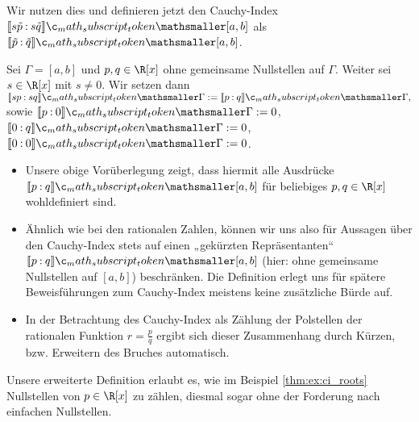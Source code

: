\documentclass{mythesis}
\begin{document}
Wir nutzen dies und definieren jetzt den Cauchy-Index $\Index{[a,b]}{s\tilde p}{s \tilde q}$ als $\Index{[a,b]}{\tilde p}{\tilde q}$.

\begin{definition} \label{thm:def:ci_common-roots}
    Sei $\Gamma = [a, b]$ und $p, q \in \R[x]$ ohne gemeinsame Nullstellen auf $\Gamma$.
    Weiter sei $s \in \R[x]$ mit $s \neq 0$.
%
    Wir setzen dann
    \begin{math}
        \Index{\Gamma}{sp}{sq} := \Index{\Gamma}{p}{q},
    \end{math}
    sowie $\Index{\Gamma}{p}{0} := 0$, $\Index{\Gamma}{0}{q} := 0$, $\Index{\Gamma}{0}{0} := 0$.
    \begin{note}
        \begin{itemize}
            \item
                Unsere obige Vorüberlegung zeigt, dass hiermit alle Ausdrücke $\Index{[a,b]}{p}{q}$ für beliebiges $p, q \in \R[x]$ wohldefiniert sind.
            \item
                Ähnlich wie bei den rationalen Zahlen, können wir uns also für Aussagen über den Cauchy-Index stets auf einen „gekürzten Repräsentanten“ $\Index{[a,b]}{p}{q}$ (hier: ohne gemeinsame Nullstellen auf $[a,b]$) beschränken.
                Die Definition erlegt uns für spätere Beweisführungen zum Cauchy-Index meistens keine zusätzliche Bürde auf.
            \item
                In der Betrachtung des Cauchy-Index als Zählung der Polstellen der rationalen Funktion $r = \frac{p}{q}$ ergibt sich dieser Zusammenhang durch Kürzen, bzw. Erweitern des Bruches automatisch.
        \end{itemize}
    \end{note}
\end{definition}

Unsere erweiterte Definition erlaubt es, wie im Beispiel \ref{thm:ex:ci_roots} Nullstellen von $p \in \R[x]$ zu zählen, diesmal sogar ohne der Forderung nach einfachen Nullstellen.
\end{document}
